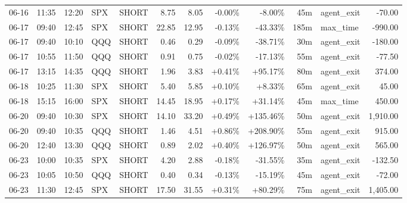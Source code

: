 \documentclass[11pt,a4paper,twoside]{article}
\begin{document}
\begin{center}
\begin{longtable}{>{\color{txtmain}}l l l l l r r r r r >{\color{txtmain}}l r}
06-16 & 11:35 & 12:20 & SPX & SHORT & 8.75 & 8.05 & \textcolor{lossred}{-0.00\%} & \textcolor{lossred}{-8.00\%} & 45m & agent\_exit & \textcolor{lossred}{-70.00} \\
06-17 & 09:40 & 12:45 & SPX & SHORT & 22.85 & 12.95 & \textcolor{lossred}{-0.13\%} & \textcolor{lossred}{-43.33\%} & 185m & max\_time & \textcolor{lossred}{-990.00} \\
06-17 & 09:40 & 10:10 & QQQ & SHORT & 0.46 & 0.29 & \textcolor{lossred}{-0.09\%} & \textcolor{lossred}{-38.71\%} & 30m & agent\_exit & \textcolor{lossred}{-180.00} \\
06-17 & 10:55 & 11:50 & QQQ & SHORT & 0.91 & 0.75 & \textcolor{lossred}{-0.02\%} & \textcolor{lossred}{-17.13\%} & 55m & agent\_exit & \textcolor{lossred}{-77.50} \\
06-17 & 13:15 & 14:35 & QQQ & SHORT & 1.96 & 3.83 & \textcolor{wingreen}{+0.41\%} & \textcolor{wingreen}{+95.17\%} & 80m & agent\_exit & \textcolor{wingreen}{374.00} \\
06-18 & 10:25 & 11:30 & SPX & SHORT & 5.40 & 5.85 & \textcolor{wingreen}{+0.10\%} & \textcolor{wingreen}{+8.33\%} & 65m & agent\_exit & \textcolor{wingreen}{45.00} \\
06-18 & 15:15 & 16:00 & SPX & SHORT & 14.45 & 18.95 & \textcolor{wingreen}{+0.17\%} & \textcolor{wingreen}{+31.14\%} & 45m & max\_time & \textcolor{wingreen}{450.00} \\
06-20 & 09:40 & 10:30 & SPX & SHORT & 14.10 & 33.20 & \textcolor{wingreen}{+0.49\%} & \textcolor{wingreen}{+135.46\%} & 50m & agent\_exit & \textcolor{wingreen}{1,910.00} \\
06-20 & 09:40 & 10:35 & QQQ & SHORT & 1.46 & 4.51 & \textcolor{wingreen}{+0.86\%} & \textcolor{wingreen}{+208.90\%} & 55m & agent\_exit & \textcolor{wingreen}{915.00} \\
06-20 & 12:40 & 13:30 & QQQ & SHORT & 0.89 & 2.02 & \textcolor{wingreen}{+0.40\%} & \textcolor{wingreen}{+126.97\%} & 50m & agent\_exit & \textcolor{wingreen}{565.00} \\
06-23 & 10:00 & 10:35 & SPX & SHORT & 4.20 & 2.88 & \textcolor{lossred}{-0.18\%} & \textcolor{lossred}{-31.55\%} & 35m & agent\_exit & \textcolor{lossred}{-132.50} \\
06-23 & 10:05 & 10:50 & QQQ & SHORT & 0.40 & 0.34 & \textcolor{lossred}{-0.13\%} & \textcolor{lossred}{-15.19\%} & 45m & agent\_exit & \textcolor{lossred}{-72.00} \\
06-23 & 11:30 & 12:45 & SPX & SHORT & 17.50 & 31.55 & \textcolor{wingreen}{+0.31\%} & \textcolor{wingreen}{+80.29\%} & 75m & agent\_exit & \textcolor{wingreen}{1,405.00} \\

\end{longtable}
\end{center}
\end{document}

